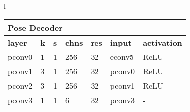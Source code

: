 \begin{tabular}[t]{l}
\begin{tabular}[t]{|l|l|l|l|l|l|l|}
\hline
\multicolumn{7}{|l|}{\textbf{Pose Decoder}} \\
\hline
\textbf{layer} & \textbf{k} & \textbf{s} & \textbf{chns} & \textbf{res} & \textbf{input} & \textbf{activation}      \\ \hline
pconv0         & 1      & 1      & 256      & 32     & econv5                    & ReLU \\ \hline
pconv1         & 3      & 1      & 256      & 32     & pconv0 & ReLU\\ \hline pconv2         & 3      & 1      & 256      & 32    & pconv1                     & ReLU\\
pconv3         & 1      & 1      & 6        & 32    & pconv3                     & - \\ \hline
\end{tabular} 
\end{tabular} 
